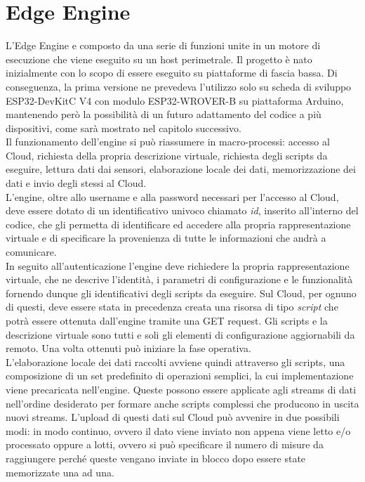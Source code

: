 \section{Edge Engine}
L'Edge Engine e composto da una serie di funzioni unite in un motore di esecuzione che viene eseguito su un host perimetrale. Il progetto è nato inizialmente con lo scopo di essere eseguito su piattaforme di fascia bassa. Di conseguenza, la prima versione ne prevedeva l’utilizzo solo su scheda di sviluppo ESP32-DevKitC V4 con modulo ESP32-WROVER-B su piattaforma Arduino, mantenendo però la possibilità di un futuro adattamento del codice a più dispositivi, come sarà mostrato nel capitolo successivo.\\
Il funzionamento dell'engine si può riassumere in macro-processi: accesso al Cloud, richiesta della propria descrizione virtuale, richiesta degli scripts da eseguire, lettura dati dai sensori, elaborazione locale dei dati, memorizzazione dei dati e invio degli stessi al Cloud.\\
L’engine, oltre allo username e alla password necessari per l’accesso al Cloud, deve essere dotato di un identificativo univoco chiamato \textit{id}, inserito all'interno del codice, che gli permetta di identificare ed accedere alla propria rappresentazione virtuale e di specificare la provenienza di tutte le informazioni che andrà a comunicare.\\
In seguito all'autenticazione l'engine deve richiedere la propria rappresentazione virtuale, che ne descrive l'identità, i parametri di configurazione e le funzionalità fornendo dunque gli identificativi degli scripts da eseguire. Sul Cloud, per ognuno di questi, deve essere stata in precedenza creata una risorsa di tipo \textit{script} che potrà essere ottenuta dall’engine tramite una GET request. Gli scripts e la descrizione virtuale sono tutti e soli gli elementi di configurazione aggiornabili da remoto. Una volta ottenuti può iniziare la fase operativa.\\
L’elaborazione locale dei dati raccolti avviene quindi attraverso gli scripts, una composizione di un set predefinito di operazioni semplici, la cui implementazione viene precaricata nell'engine. Queste possono essere applicate agli streams di dati nell'ordine desiderato per formare anche scripts complessi che producono in uscita nuovi streams. L'upload di questi dati sul Cloud può avvenire in due possibili modi: in modo continuo, ovvero il dato viene inviato non appena viene letto e/o processato oppure a lotti, ovvero si può specificare il numero di misure da raggiungere perché queste vengano inviate in blocco dopo essere state memorizzate una ad una.\\
